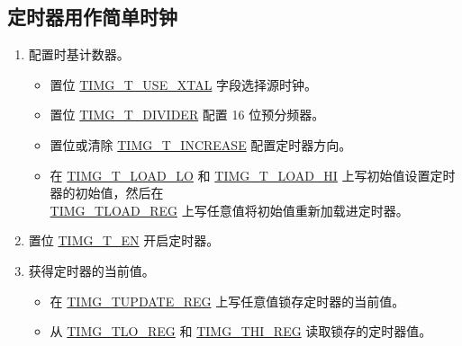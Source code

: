 \documentclass[main\_\_CN.tex]{subfiles}
\begin{document}
\subsection{定时器用作简单时钟}\label{simple_clock}
\begin{enumerate}
    \item 配置时基计数器。
    \begin{itemize}
        \item 置位 \hyperref[fielddesc:TIMGTXUSEXTAL]{TIMG\_T\_USE\_XTAL} 字段选择源时钟。
        \item 置位 \hyperref[fielddesc:TIMGTXDIVIDER]{TIMG\_T\_DIVIDER} 配置 16 位预分频器。
        \item 置位或清除 \hyperref[fielddesc:TIMGTXINCREASE]{TIMG\_T\_INCREASE} 配置定时器方向。
        \item 在 \hyperref[fielddesc:TIMGTXLOADLO]{TIMG\_T\_LOAD\_LO} 和 \hyperref[fielddesc:TIMGTXLOADHI]{TIMG\_T\_LOAD\_HI} 上写初始值设置定时器的初始值，然后在 \\\hyperref[regdesc:TIMGTXLOADREG]{TIMG\_TLOAD\_REG} 上写任意值将初始值重新加载进定时器。
    \end{itemize}
    \item 置位 \hyperref[fielddesc:TIMGTXEN]{TIMG\_T\_EN} 开启定时器。
    \item 获得定时器的当前值。
    \begin{itemize}
        \item 在 \hyperref[regdesc:TIMGTXUPDATEREG]{TIMG\_TUPDATE\_REG} 上写任意值锁存定时器的当前值。
        \item 从 \hyperref[regdesc:TIMGTXLOREG]{TIMG\_TLO\_REG} 和 \hyperref[regdesc:TIMGTXHIREG]{TIMG\_THI\_REG} 读取锁存的定时器值。
    \end{itemize}
\end{enumerate}
\end{document}
